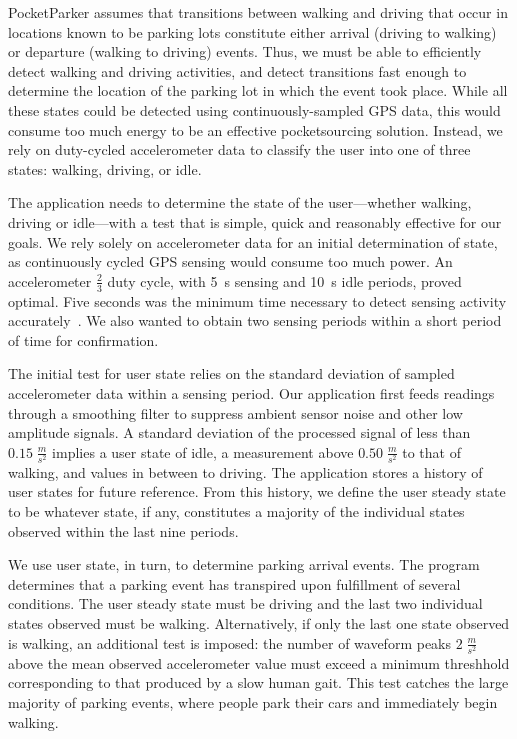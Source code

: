 PocketParker assumes that transitions between walking and driving that occur
in locations known to be parking lots constitute either arrival (driving to
walking) or departure (walking to driving) events. Thus, we must be able to
efficiently detect walking and driving activities, and detect transitions
fast enough to determine the location of the parking lot in which the event
took place. While all these states could be detected using
continuously-sampled GPS data, this would consume too much energy to be an
effective pocketsourcing solution. Instead, we rely on duty-cycled
accelerometer data to classify the user into one of three states: walking,
driving, or idle.

The application needs to determine the state of the user---whether walking,
driving or idle---with a test that is simple, quick and reasonably effective
for our goals. We rely solely on accelerometer data for an initial
determination of state, as continuously cycled GPS sensing would consume too
much power. An accelerometer $\frac{2}{3}$ duty cycle, with 5~s sensing and
10~s idle periods, proved optimal. Five seconds was the minimum time
necessary to detect sensing activity accurately~\cite{FIXME}. We also wanted
to obtain two sensing periods within a short period of time for confirmation.

The initial test for user state relies on the standard deviation of sampled
accelerometer data within a sensing period. Our application first feeds
readings through a smoothing filter to suppress ambient sensor noise and
other low amplitude signals. A standard deviation of the processed signal of
less than $0.15\;\frac{m}{s^2}$ implies a user state of idle, a measurement
above $0.50\;\frac{m}{s^2}$ to that of walking, and values in between to
driving. The application stores a history of user states for future
reference. From this history, we define the user steady state to be whatever
state, if any, constitutes a majority of the individual states observed
within the last nine periods.

We use user state, in turn, to determine parking arrival events. The program
determines that a parking event has transpired upon fulfillment of several
conditions. The user steady state must be driving and the last two
individual states observed must be walking. Alternatively, if only the last
one state observed is walking, an additional test is imposed: the number of
waveform peaks $2\;\frac{m}{s^2}$ above the mean observed accelerometer value
must exceed a minimum threshhold corresponding to that produced by a slow
human gait. This test catches the large majority of parking events, where
people park their cars and immediately begin walking.

